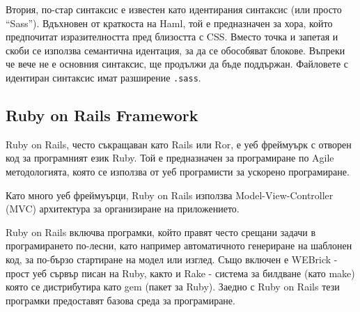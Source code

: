 \documentclass[a4paper]{article}
\begin{document}
  Втория, по-стар синтаксис е известен като идентирания синтаксис (или просто ``Sass''). Вдъхновен от краткоста на Haml, той е предназначен за хора, който предпочитат изразителността пред близостта с CSS. Вместо точка и запетая и скоби се използва семантична идентация, за да се обособяват блокове. Въпреки че вече не е основния синтаксис, ще продължи да бъде поддържан. Файловете с идентиран синтаксис имат разширение \texttt{.sass}.

  \subsection{Ruby on Rails Framework}
  Ruby on Rails, често съкращаван като Rails или Ror, е уеб фреймуърк с отворен код за програмният език Ruby. Той е предназначен за програмиране по Agile методологията, която се използва от уеб програмисти за ускорено програмиране.

  Като много уеб фреймуърци, Ruby on Rails използва Model-View-Controller (MVC) архитектура за организиране на приложението.

  Ruby on Rails включва програмки, който правят често срещани задачи в програмирането по-лесни, като например автоматичното генериране на шаблонен код, за по-бързо стартиране на модел или изглед. Също включен е WEBrick - прост уеб сървър писан на Ruby, както и Rake - система за билдване (като make) която се дистрибутира като gem (пакет за Ruby). Заедно с Ruby on Rails тези програмки предоставят базова среда за програмиране.
\end{document}
